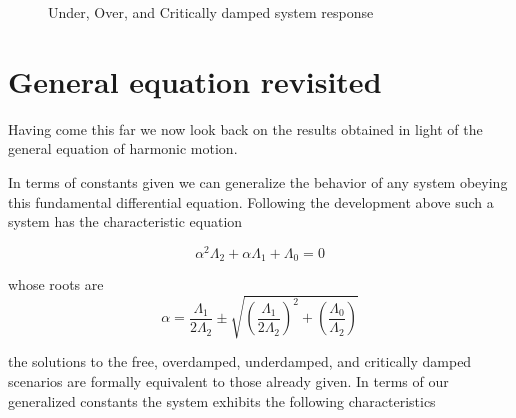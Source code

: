\documentclass[11pt]{book}
\begin{document}
\begin{figure}[h!]

  \centering
    \caption{Under, Over, and Critically damped system response}
      \label{harmonic_oscillator_plots}
\end{figure}

\section*{General equation revisited}
Having come this far we now look back on the results obtained in light
of the general equation of harmonic motion.

In terms of constants given we can generalize the behavior of any
system obeying this fundamental differential equation.  Following the
development above such a system has the characteristic equation

\begin{equation*}
  \alpha^2 \Lambda_2 + \alpha \Lambda_1 + \Lambda_0 = 0
\end{equation*}

whose roots are
\begin{equation*}
\alpha = \frac{\Lambda_1}{2\Lambda_2} \pm \sqrt{\left(\frac{\Lambda_1}{2\Lambda_2}\right)^2 + \left(\frac{\Lambda_0}{\Lambda_2}\right)}  
\end{equation*}

the solutions to the free, overdamped, underdamped, and critically
damped scenarios are formally equivalent to those already given.  In terms of
our generalized constants the system exhibits the following characteristics
\end{document}
